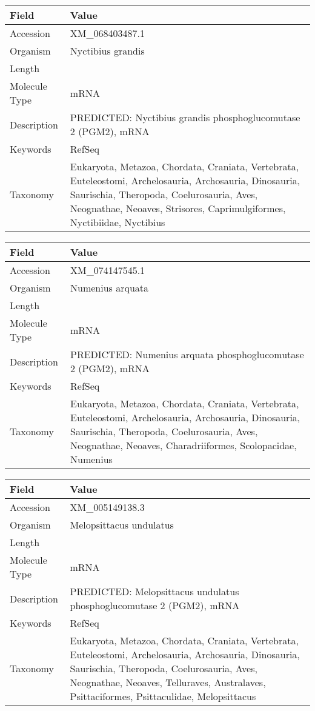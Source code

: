 \documentclass[10pt]{article}
\begin{document}
\vspace{1em}
{\footnotesize
\begin{longtable}{>{\raggedright\arraybackslash}p{4.5cm} >{\raggedright\arraybackslash}p{11.5cm}}
\textbf{Field} & \textbf{Value} \\
\hline
Accession & XM\_068403487.1 \\
Organism & Nyctibius grandis \\
Length & 2210 \\
Molecule Type & mRNA \\
Description & PREDICTED: Nyctibius grandis phosphoglucomutase 2 (PGM2), mRNA \\
Keywords & RefSeq \\
Taxonomy & Eukaryota, Metazoa, Chordata, Craniata, Vertebrata, Euteleostomi, Archelosauria, Archosauria, Dinosauria, Saurischia, Theropoda, Coelurosauria, Aves, Neognathae, Neoaves, Strisores, Caprimulgiformes, Nyctibiidae, Nyctibius \\
\end{longtable}
}

\vspace{1em}
{\footnotesize
\begin{longtable}{>{\raggedright\arraybackslash}p{4.5cm} >{\raggedright\arraybackslash}p{11.5cm}}
\textbf{Field} & \textbf{Value} \\
\hline
Accession & XM\_074147545.1 \\
Organism & Numenius arquata \\
Length & 2929 \\
Molecule Type & mRNA \\
Description & PREDICTED: Numenius arquata phosphoglucomutase 2 (PGM2), mRNA \\
Keywords & RefSeq \\
Taxonomy & Eukaryota, Metazoa, Chordata, Craniata, Vertebrata, Euteleostomi, Archelosauria, Archosauria, Dinosauria, Saurischia, Theropoda, Coelurosauria, Aves, Neognathae, Neoaves, Charadriiformes, Scolopacidae, Numenius \\
\end{longtable}
}

\vspace{1em}
{\footnotesize
\begin{longtable}{>{\raggedright\arraybackslash}p{4.5cm} >{\raggedright\arraybackslash}p{11.5cm}}
\textbf{Field} & \textbf{Value} \\
\hline
Accession & XM\_005149138.3 \\
Organism & Melopsittacus undulatus \\
Length & 2156 \\
Molecule Type & mRNA \\
Description & PREDICTED: Melopsittacus undulatus phosphoglucomutase 2 (PGM2), mRNA \\
Keywords & RefSeq \\
Taxonomy & Eukaryota, Metazoa, Chordata, Craniata, Vertebrata, Euteleostomi, Archelosauria, Archosauria, Dinosauria, Saurischia, Theropoda, Coelurosauria, Aves, Neognathae, Neoaves, Telluraves, Australaves, Psittaciformes, Psittaculidae, Melopsittacus \\
\end{longtable}
}
\end{document}
